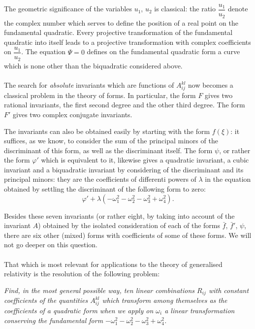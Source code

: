 \documentclass[leqno,12pt]{article}
\makeatletter
\let\old@phi\phi
\let\old@varphi\varphi
\let\phi\old@varphi
\let\varphi\old@phi
\theoremstyle{shape1}
\theoremstyle{shape0}
\theoremstyle{shape2}
\theoremstyle{definition}
\makeatother
\begin{document}
The geometric significance of the variables $u_{1}$, $u_{2}$ is classical: the ratio $\dfrac{u_{1}}{u_{2}}$ denote the complex number which serves to define the position of a real point on the fundamental quadratic. Every projective transformation of the fundamental quadratic into itself leads to a projective transformation with complex coefficients on $\dfrac{u_{1}}{u_{2}}$. The equation $\Psi=0$ defines on the fundamental quadratic form a curve which is none other than the biquadratic considered above.

\paragraph{}
\label{sec:31}

The search for \emph{absolute} invariants which are functions of $A^{kl}_{ij}$ now becomes a classical problem in the theory of forms. In particular, the form $F$ gives two rational invariants, the first second degree and the other third degree. The form $F'$ gives two complex conjugate invariants.

The invariants can also be obtained easily by starting with the form $f(\xi)$: it suffices, as we know, to consider the sum of the principal minors of the discriminant of this form, as well as the discriminant itself. The form $\psi$, or rather the form $\phi'$ which is equivalent to it, likewise gives a quadratic invariant, a cubic invariant and a biquadratic invariant by considering of the discriminant and its principal minors: they are the coefficients of differenti powers of $\lambda$ in the equation obtained by settling the discriminant of the following form to zero:
\[
\phi'+\lambda(-\omega_{1}^{2}-\omega_{2}^{2}-\omega_{3}^{2}+\omega_{4}^{2}).
\]

Besides these seven invariants (or rather eight, by taking into account of the invariant $A$) obtained by the isolated consideration of each of the forms $\bar f$, $\bar f'$, $\psi$, there are six other (mixed) forms with coefficients of some of these forms. We will not go deeper on this question.


\paragraph{}
\label{sec:32}
That which is most relevant for applications to the theory of generalised relativity is the resolution of the following problem:

\emph{Find, in the most general possible way, ten linear combinations $R_{ij}$ with constant coefficients of the quantities $A_{ij}^{kl}$ which transform among themselves as the coefficients of a quadratic form when we apply on $\omega_{i}$ a linear transformation conserving the fundamental form $-\omega_{1}^{2}-\omega_{2}^{2}-\omega_{3}^{2}+\omega_{4}^{2}$.}
\end{document}
